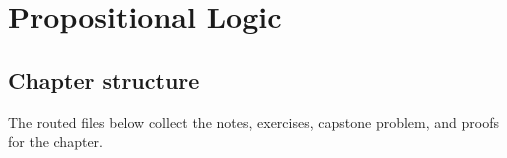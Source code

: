 \chapter{Propositional Logic}
\label{ch:propositional-logic}
\section*{Chapter structure}
The routed files below collect the notes, exercises, capstone problem, and
proofs for the chapter.

\LRAExcludeFromPrintEditionBegin


\LRAExcludeFromPrintEditionEnd
